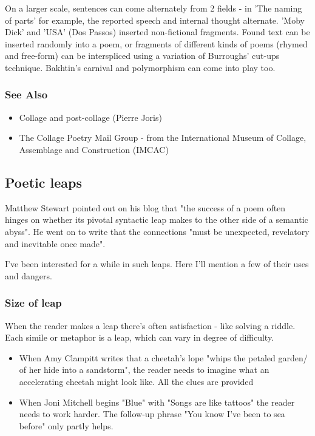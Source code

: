 \documentclass[11pt]{article}
\begin{document}
On a larger scale, sentences can come alternately from 2 fields - in 'The naming of parts' for example, the reported speech and internal thought alternate. 'Moby Dick' and 'USA' (Dos Passos) inserted non-fictional fragments. Found text can be inserted randomly into a poem, or fragments of different kinds of poems (rhymed and free-form) can be interspliced using a variation of Burroughs' cut-ups technique. Bakhtin's carnival and polymorphism can come into play too.

\subsubsection*{See Also}

\begin{itemize}
\item Collage and post-collage (Pierre Joris)
\item The Collage Poetry Mail Group - from the International Museum of Collage, Assemblage and Construction (IMCAC)
\end{itemize}


\newpage\subsection{Poetic leaps}

Matthew Stewart pointed out on his blog that "the success of a poem often hinges on whether its pivotal syntactic leap makes to the other side of a semantic abyss". He went on to write that the connections "must be unexpected, revelatory and inevitable once made".

I've been interested for a while in such leaps. Here I'll mention a few of their uses and dangers.

\subsubsection*{Size of leap}

When the reader makes a leap there's often satisfaction - like solving a riddle. Each simile or metaphor is a leap, which can vary in degree of difficulty.
\begin{itemize}
\item    When Amy Clampitt writes that a cheetah's lope "whips the petaled garden/ of her hide into a sandstorm", the reader needs to imagine what an accelerating cheetah might look like. All the clues are provided
\item    When Joni Mitchell begins "Blue" with "Songs are like tattoos" the reader needs to work harder. The follow-up phrase "You know I've been to sea before" only partly helps.
\end{itemize}
\end{document}
